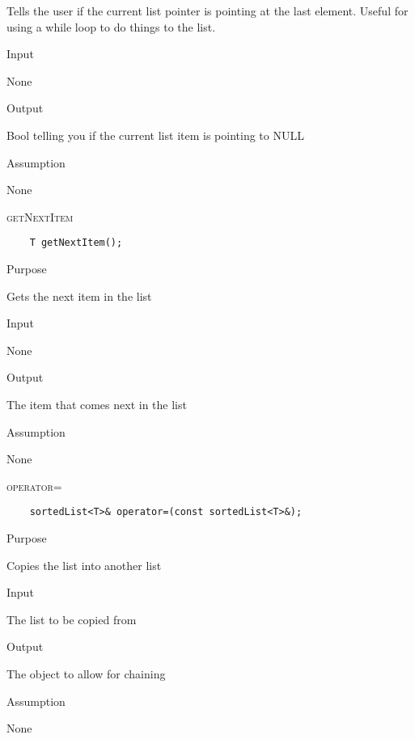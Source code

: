 \documentclass[pdftex, 11pt]{article}
\begin{document}
\begin{description}
\begin{description}
				Tells the user if the current list pointer is pointing at the last element. Useful for using a while
				loop to do things to the list.

			\item{Input}

				None

			\item{Output}

				Bool telling you if the current list item is pointing to NULL

			\item{Assumption}

				None

		\end{description}

	\item{\textsc{getNextItem}}
\begin{lstlisting}
	T getNextItem();
\end{lstlisting}

		\begin{description}

			\item{Purpose}

				Gets the next item in the list

			\item{Input}

				None

			\item{Output}

				The item that comes next in the list

			\item{Assumption}

				None

		\end{description}


\item{\textsc{operator=}}
\begin{lstlisting}
	sortedList<T>& operator=(const sortedList<T>&);
		\end{lstlisting}

		\begin{description}

			\item{Purpose}

				Copies the list into another list

			\item{Input}

				The list to be copied from

			\item{Output}

				The object to allow for chaining

			\item{Assumption}

				None

		\end{description}

\end{description}
\end{document}
